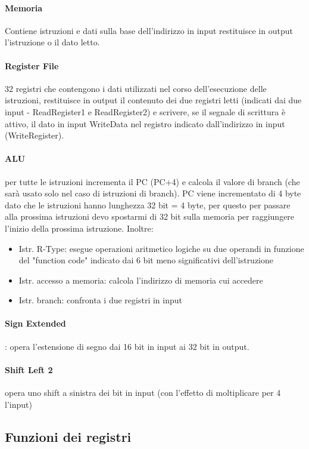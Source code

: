 \documentclass[12pt, a4paper, openany]{book}
\begin{document}
\paragraph*{Memoria} Contiene istruzioni e dati sulla base dell'indirizzo in input
restituisce in output l'istruzione o il dato letto.
\paragraph*{Register File} 32 registri che contengono i dati utilizzati nel corso
dell'esecuzione delle istruzioni, restituisce in output il contenuto dei due registri
letti (indicati dai due input - ReadRegister1 e ReadRegister2) e scrivere, se il segnale
di scrittura è attivo, il dato in input WriteData nel registro indicato dall'indirizzo
in input (WriteRegister).
\paragraph*{ALU} per tutte le istruzioni incrementa il PC (PC+4) e calcola il valore
di branch (che sarà usato solo nel caso di istruzioni di branch).
PC viene incrementato di 4 byte dato che le istruzioni hanno lunghezza 32 bit = 4 byte,
per questo per passare alla prossima istruzioni devo spostarmi di 32 bit sulla memoria
per raggiungere l'inizio della prossima istruzione.
Inoltre:
\begin{itemize}
    \item Istr. R-Type: esegue operazioni aritmetico logiche su due operandi in funzione
    del "function code" indicato dai 6 bit meno significativi dell'istruzione
    \item Istr. accesso a memoria: calcola l'indirizzo di memoria cui accedere
    \item Istr. branch: confronta i due registri in input
\end{itemize}
\paragraph*{Sign Extended}: opera l'estensione di segno dai 16 bit in input ai 32 bit in output.
\paragraph*{Shift Left 2} opera uno shift a sinistra dei bit in input (con l'effetto di 
moltiplicare per 4 l'input)

\subsection{Funzioni dei registri}
\end{document}
